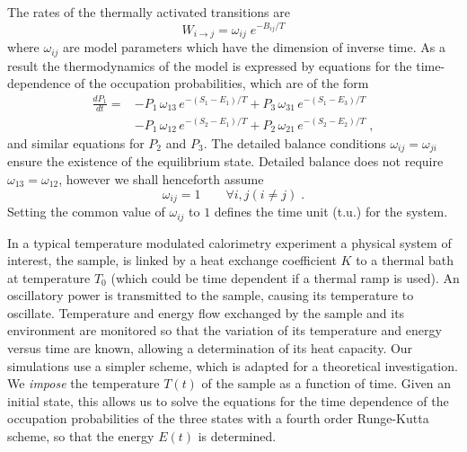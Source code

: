 \documentclass[pre,a4paper,twocolumn,superscriptaddress,%
floatfix]{revtex4}
\begin{document}
The rates of the thermally activated transitions are
\begin{equation}
  \label{eq:wij}
  W_{i \to j} = \omega_{ij} \; e^{- B_{ij}/T}
\end{equation}
where $\omega_{ij}$ are model parameters which have the dimension of inverse
time. As a result the thermodynamics of the model is expressed by equations
for the time-dependence of the occupation probabilities, which are of the form
\begin{align}
  \label{eq:dp1dt}
  \frac{d P_1}{dt} = &- P_1 \, \omega_{13} \, e^{-(S_1 - E_1)/T} +
                       P_3 \, \omega_{31} \, e^{-(S_1 - E_3)/T}  \nonumber \\
                     & - P_1 \, \omega_{12} \, e^{-(S_2 - E_1)/T} +
                  P_2 \, \omega_{21} \, e^{-(S_2 - E_2)/T} \; ,
\end{align}
and similar equations for $P_2$ and $P_3$.
The detailed balance conditions $\omega_{ij} = \omega_{ji}$ ensure the
existence of the equilibrium 
state. Detailed balance does not require $\omega_{13} = \omega_{12}$, however
we shall henceforth assume
\begin{equation}
  \label{eq:omeg1}
  \omega_{ij} = 1 \qquad \forall i, j (i \not= j) \;.
\end{equation}
Setting the common value of $\omega_{ij}$ to $1$ defines the time unit (t.u.)
for the system.

\bigskip
In a typical temperature modulated calorimetry experiment a physical system of
interest, the 
sample, is linked by a heat exchange coefficient $K$ to a thermal bath at
temperature $T_0$ (which could be time dependent if a thermal ramp is used). An
oscillatory power is transmitted to the sample, causing its temperature to
oscillate. Temperature and energy flow exchanged by the sample and its
environment are
monitored so that the variation of its temperature and energy versus time are
known, allowing a determination of its heat capacity. Our simulations use a
simpler scheme, which is adapted for a theoretical investigation. We {\em
  impose} the temperature $T(t)$ of the sample as a function
of time. Given an initial state,
this allows us to solve the equations for the time dependence of the
occupation probabilities of the three states with a
fourth order Runge-Kutta scheme, so that the energy $E(t)$ is
determined.
\end{document}
